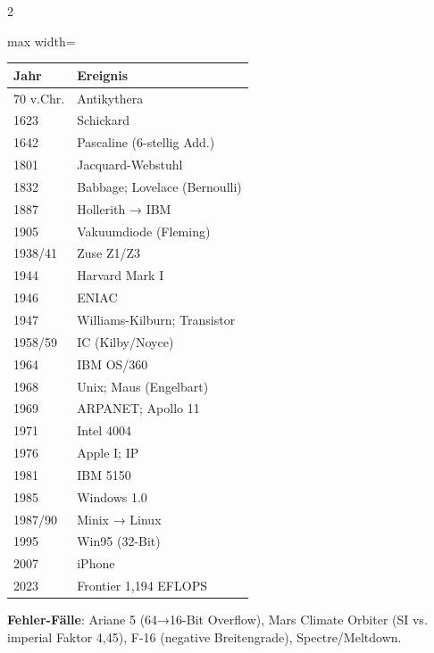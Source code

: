 \documentclass[10pt, a4paper]{article}
\begin{document}
\begin{multicols}{2}
{\small
\begin{adjustbox}{max width=\linewidth}
{\scriptsize
\begin{tabular}{ll}
\toprule
\textbf{Jahr} & \textbf{Ereignis} \\
\midrule
70 v.Chr. & Antikythera \\
1623 & Schickard \\
1642 & Pascaline (6-stellig Add.) \\
1801 & Jacquard-Webstuhl \\
1832 & Babbage; Lovelace (Bernoulli) \\
1887 & Hollerith → IBM \\
1905 & Vakuumdiode (Fleming) \\
1938/41 & Zuse Z1/Z3 \\
1944 & Harvard Mark I \\
1946 & ENIAC \\
1947 & Williams-Kilburn; Transistor \\
1958/59 & IC (Kilby/Noyce) \\
1964 & IBM OS/360 \\
1968 & Unix; Maus (Engelbart) \\
1969 & ARPANET; Apollo 11 \\
1971 & Intel 4004 \\
1976 & Apple I; IP \\
1981 & IBM 5150 \\
1985 & Windows 1.0 \\
1987/90 & Minix → Linux \\
1995 & Win95 (32-Bit) \\
2007 & iPhone \\
2023 & Frontier 1,194 EFLOPS \\
\bottomrule
\end{tabular}
}
\end{adjustbox}
}


\textbf{Fehler-Fälle}: Ariane 5 (64→16-Bit Overflow), Mars Climate Orbiter (SI vs. imperial Faktor 4,45), F-16 (negative Breitengrade), Spectre/Meltdown.








\end{multicols}
\end{document}
